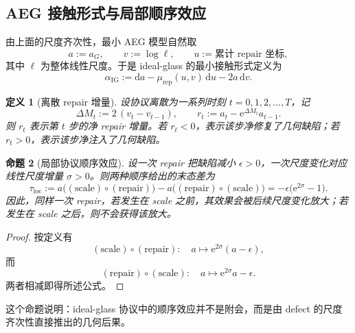 \documentclass[12pt]{ctexart}
\newtheorem{definition}{定义}[section]
\newtheorem{proposition}[definition]{命题}
\newcommand{\IG}{\mathrm{IG}}
\newcommand{\dd}{\mathrm{d}}
\newcommand{\ee}{\mathrm{e}}
\newcommand{\rep}{\mathrm{rep}}
\begin{document}
\subsection{AEG 接触形式与局部顺序效应}

由上面的尺度齐次性，最小 AEG 模型自然取
\begin{equation}
 a := a_G,
 \qquad v := \log \ell,
 \qquad u := \text{累计 repair 坐标},
\end{equation}
其中 $\ell$ 为整体线性尺度。于是 ideal-glass 的最小接触形式定义为
\begin{equation}
\alpha_{\IG} := \dd a - \mu_{\rep}(u,v)\,\dd u - 2a\,\dd v.
\end{equation}

\begin{definition}[离散 repair 增量]
设协议离散为一系列时刻 $t=0,1,2,\dots,T$，记
\begin{equation}
\Delta M_t := 2\,(v_t-v_{t-1}),
\qquad
r_t := a_t - \ee^{\Delta M_t}a_{t-1}.
\end{equation}
则 $r_t$ 表示第 $t$ 步的净 repair 增量。若 $r_t<0$，表示该步净修复了几何缺陷；若 $r_t>0$，表示该步净注入了几何缺陷。
\end{definition}

\begin{proposition}[局部协议顺序效应]
设一次 repair 把缺陷减小 $\epsilon>0$，一次尺度变化对应线性尺度增量 $\sigma>0$。则两种顺序给出的末态差为
\begin{equation}
\tau_{\mathrm{loc}}
:= a\bigl((\mathrm{scale})\circ(\mathrm{repair})\bigr)
 - a\bigl((\mathrm{repair})\circ(\mathrm{scale})\bigr)
= -\epsilon\bigl(\ee^{2\sigma}-1\bigr).
\end{equation}
因此，同样一次 repair，若发生在 scale 之前，其效果会被后续尺度变化放大；若发生在 scale 之后，则不会获得该放大。
\end{proposition}

\begin{proof}
按定义有
\begin{equation}
(\mathrm{scale})\circ(\mathrm{repair}):
\quad a\mapsto \ee^{2\sigma}(a-\epsilon),
\end{equation}
而
\begin{equation}
(\mathrm{repair})\circ(\mathrm{scale}):
\quad a\mapsto \ee^{2\sigma}a-\epsilon.
\end{equation}
两者相减即得所述公式。
\end{proof}

这个命题说明：ideal-glass 协议中的顺序效应并不是附会，而是由 defect 的尺度齐次性直接推出的几何后果。
\end{document}
